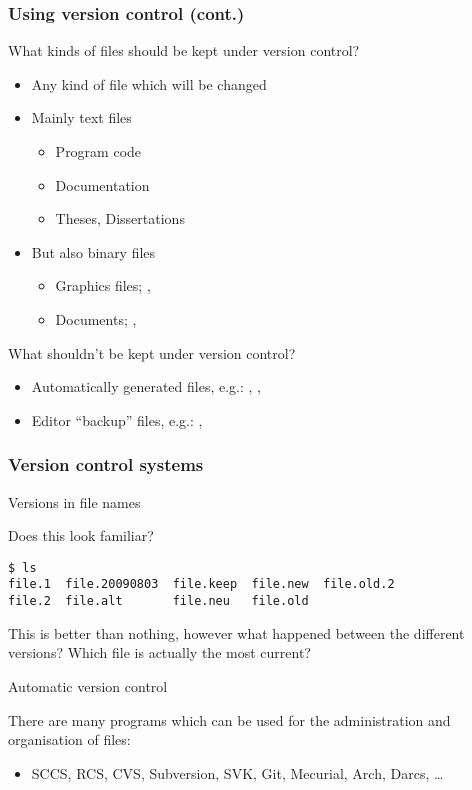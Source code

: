 \begin{frame}
\frametitle{Using version control (cont.)}
{\large \alert{What kinds of files should be kept under version control?}}

\begin{itemize}
\item Any kind of file which will be changed
\item Mainly text files
    \begin{itemize}
    \item Program code
    \item Documentation
    \item Theses, Dissertations
    \end{itemize}
\item But also binary files
    \begin{itemize}
    \item Graphics files; , 
    \item Documents; , 
    \end{itemize}
\end{itemize}

{\large \alert{What shouldn't be kept under version control?}}

\begin{itemize}
\item Automatically generated files, e.g.: , ,
\item Editor \enquote{backup} files, e.g.: , 
\end{itemize}

\end{frame}


\begin{frame}[fragile]
\frametitle{Version control systems}
{\large \alert{Versions in file names}}

Does this look familiar?
\begin{lstlisting}
$ ls
file.1  file.20090803  file.keep  file.new  file.old.2
file.2  file.alt       file.neu   file.old
\end{lstlisting}

This is better than nothing, however what happened between the different
versions?  Which file is actually the most current?

{\large \alert{Automatic version control}}

There are many programs which can be used for the administration and
organisation of files:

\begin{itemize}
\item SCCS, RCS, CVS, Subversion, SVK, Git, Mecurial, Arch, Darcs, \ldots
\end{itemize}

\end{frame}


